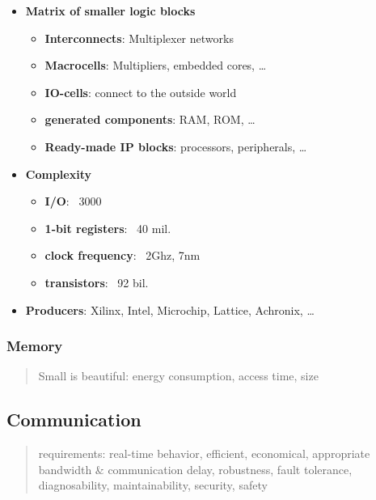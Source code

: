\documentclass{article}
\begin{document}
\begin{itemize}
  \item \textbf{Matrix of smaller logic blocks}
        \begin{itemize}
          \item \textbf{Interconnects}: Multiplexer networks
          \item \textbf{Macrocells}: Multipliers, embedded cores, …
          \item \textbf{IO-cells}: connect to the outside world
          \item \textbf{generated components}: RAM, ROM, …
          \item \textbf{Ready-made IP blocks}: processors, peripherals, …
        \end{itemize}
  \item \textbf{Complexity}
        \begin{itemize}
          \item \textbf{I/O}: ~3000
          \item \textbf{1-bit registers}: ~40 mil.
          \item \textbf{clock frequency}: ~2Ghz, 7nm
          \item \textbf{transistors}: ~92 bil.
        \end{itemize}
  \item \textbf{Producers}: Xilinx, Intel, Microchip, Lattice, Achronix, …
\end{itemize}

\subsubsection{Memory}
\begin{quote}Small is beautiful: energy consumption, access time, size\end{quote}


\subsection{Communication}
\begin{quote}requirements: real-time behavior, efficient, economical, appropriate bandwidth \& communication delay, robustness, fault tolerance, diagnosability, maintainability, security, safety\end{quote}
\end{document}
